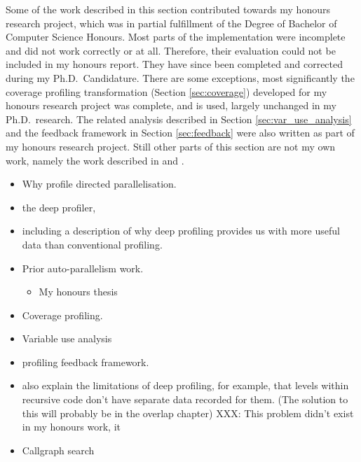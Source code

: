 

Some of the work described in this section contributed towards my honours research project,
which was in partial fulfillment of the Degree of Bachelor of Computer Science
Honours.
Most parts of the implementation were incomplete and did not work correctly or
at all.
Therefore,
their evaluation could not be included in my honours report.
They have since been completed and corrected during my Ph.D.\ Candidature.
There are some exceptions,
most significantly the coverage profiling transformation (Section \ref{sec:coverage})
developed for my honours research project was complete, and is used, largely
unchanged in my Ph.D.\ research.
The related analysis described in Section \ref{sec:var_use_analysis}
and the feedback framework in Section \ref{sec:feedback}
were also written as part of my honours research project.
Still other parts of this section are not my own work,
namely the work described in
\citet{conway:2001:mercury-deep} and
\citet{tannier:2007:parallel_mercury}.


\begin{itemize}
\item Why profile directed parallelisation.
\item the deep profiler,
\item including a description of why deep profiling provides us with
      more useful data than conventional profiling.
\item Prior auto-parallelism work.
\begin{itemize}
    \item My honours thesis
\end{itemize}
\item Coverage profiling.
\item Variable use analysis
\item profiling feedback framework.
\end{itemize}

\begin{itemize}
\item also explain the limitations of deep profiling,
      for example, that levels within recursive code don't have separate
      data recorded for them.
      (The solution to this will probably be in the overlap chapter)
      XXX: This problem didn't exist in my honours work, it
\item Callgraph search
\end{itemize}

